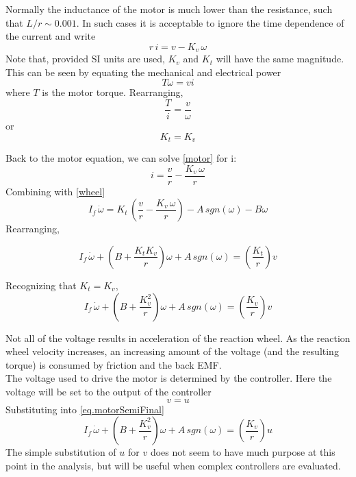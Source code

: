 \documentclass[12pt,letterpaper]{article}
\begin{document}
Normally the inductance of the motor is much lower than the resistance, such that $L/r \sim 0.001$.  
In such cases it is acceptable to ignore the time dependence of the current and write
%
\begin{equation}
    r \,i = v - K_{v} \, \omega \label{motor}
\end{equation}
%
Note that, provided SI units are used, $K_{v}$ and $K_{t}$ will have the same magnitude.  This can be seen by equating the 
mechanical and electrical power
%
\begin{equation}
    T \omega = v i
\end{equation}
%
where $T$ is the motor torque.
Rearranging,
%
\begin{equation}
    \frac{T}{i} = \frac{v}{\omega}
\end{equation}
%
or
%
\begin{equation}
    K_{t} = K_{v} 
\end{equation}
%

Back to the motor equation, we can solve \eqref{motor} for i:
%
\begin{equation}
    i = \frac{v}{r} - \frac{K_{v} \, \omega}{r}
\end{equation}
%
Combining with \eqref{wheel}
%
\begin{equation}
    I_{f} \, \dot{\omega}  =  K_{t} \, \left( \frac{v}{r} - \frac{ K_{v} \, \omega}{r} \right) - A \, sgn(\omega ) - B \omega
\end{equation}
Rearranging,

\begin{equation}
    I_{f} \, \dot{\omega} + \left( B+\frac{K_{t} K_{v}}{r} \right) \omega +A \, sgn(\omega)= \left(\frac{K_{t}} {r}\right)v 
\end{equation}

Recognizing that $K_{t} = K_{v}$,
\begin{equation}
    I_{f} \, \dot{\omega} + \left( B+\frac{K_{v}^2}{r} \right) \omega +A \, sgn(\omega)= \left(\frac{K_{v}} {r}\right)v\label{eq.motorSemiFinal} 
\end{equation}

Not all of the voltage results in acceleration of the reaction wheel.  As the reaction wheel velocity increases, an
increasing amount of the voltage (and the resulting torque) is consumed by friction and the back EMF.\\

The voltage used to drive the motor is determined by the controller.  Here the voltage will be set to the output of the controller
\begin{equation}
    v = u 
\end{equation}
Substituting into \eqref{eq.motorSemiFinal}
\begin{equation}
    I_{f} \, \dot{\omega} + \left( B+\frac{K_{v}^2}{r} \right) \omega +A \, sgn(\omega)= \left(\frac{K_{v}} {r}\right)u\label{eq.motorFinal} 
\end{equation}
The simple substitution of $u$ for $v$ does not seem to have much purpose at this point in the analysis, but will be useful
when complex controllers are evaluated.\\
\end{document}
